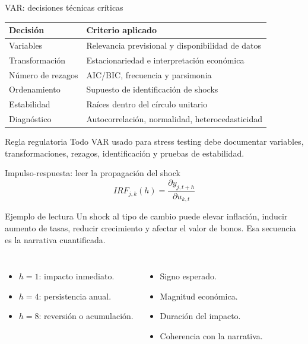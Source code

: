 \documentclass[10pt,aspectratio=169]{beamer}
\begin{document}
\begin{frame}{VAR: decisiones técnicas críticas}
\begin{table}
\small
\begin{tabular}{p{3.2cm}p{7.6cm}}
\toprule
Decisión & Criterio aplicado \\
\midrule
Variables & Relevancia previsional y disponibilidad de datos \\
Transformación & Estacionariedad e interpretación económica \\
Número de rezagos & AIC/BIC, frecuencia y parsimonia \\
Ordenamiento & Supuesto de identificación de shocks \\
Estabilidad & Raíces dentro del círculo unitario \\
Diagnóstico & Autocorrelación, normalidad, heterocedasticidad \\
\bottomrule
\end{tabular}
\end{table}

\begin{block}{Regla regulatoria}
Todo VAR usado para stress testing debe documentar variables, transformaciones, rezagos, identificación y pruebas de estabilidad.
\end{block}
\end{frame}

\begin{frame}{Impulso-respuesta: leer la propagación del shock}
\[
IRF_{j,k}(h) = \frac{\partial y_{j,t+h}}{\partial u_{k,t}}
\]

\begin{block}{Ejemplo de lectura}
Un shock al tipo de cambio puede elevar inflación, inducir aumento de tasas, reducir crecimiento y afectar el valor de bonos. Esa secuencia es la narrativa cuantificada.
\end{block}

\begin{columns}
\begin{itemize}
  \item $h=1$: impacto inmediato.
  \item $h=4$: persistencia anual.
  \item $h=8$: reversión o acumulación.
\end{itemize}

\begin{itemize}
  \item Signo esperado.
  \item Magnitud económica.
  \item Duración del impacto.
  \item Coherencia con la narrativa.
\end{itemize}
\end{columns}
\end{frame}
\end{document}
